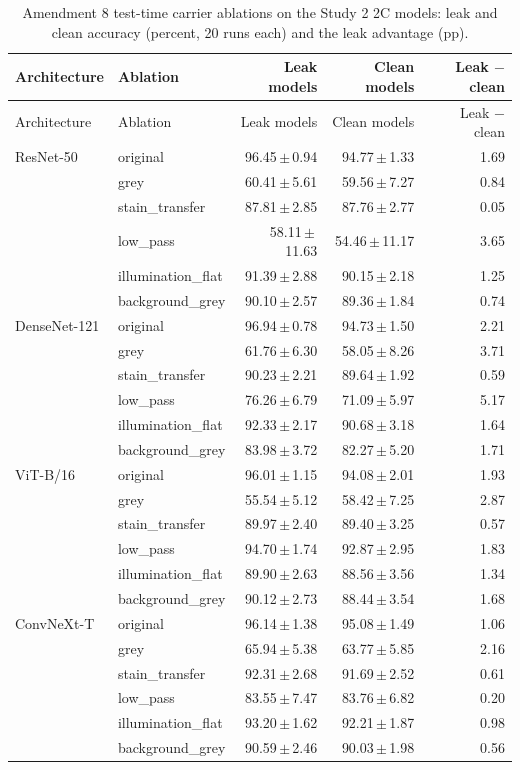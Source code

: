 {\footnotesize
\setlength{\tabcolsep}{3.5pt}
\begin{longtable}{llrrr}
\caption{Amendment 8 test-time carrier ablations on the Study 2 2C models: leak and clean accuracy (percent, 20 runs each) and the leak advantage (pp).}\label{r:tab:ablation}\\
\toprule
Architecture & Ablation & Leak models & Clean models & Leak $-$ clean \\
\midrule
\endfirsthead
\toprule
Architecture & Ablation & Leak models & Clean models & Leak $-$ clean \\
\midrule
\endhead
\bottomrule
\endfoot
ResNet-50 & original & 96.45\,$\pm$\,0.94 & 94.77\,$\pm$\,1.33 & 1.69 \\
 & grey & 60.41\,$\pm$\,5.61 & 59.56\,$\pm$\,7.27 & 0.84 \\
 & stain\_transfer & 87.81\,$\pm$\,2.85 & 87.76\,$\pm$\,2.77 & 0.05 \\
 & low\_pass & 58.11\,$\pm$\,11.63 & 54.46\,$\pm$\,11.17 & 3.65 \\
 & illumination\_flat & 91.39\,$\pm$\,2.88 & 90.15\,$\pm$\,2.18 & 1.25 \\
 & background\_grey & 90.10\,$\pm$\,2.57 & 89.36\,$\pm$\,1.84 & 0.74 \\
DenseNet-121 & original & 96.94\,$\pm$\,0.78 & 94.73\,$\pm$\,1.50 & 2.21 \\
 & grey & 61.76\,$\pm$\,6.30 & 58.05\,$\pm$\,8.26 & 3.71 \\
 & stain\_transfer & 90.23\,$\pm$\,2.21 & 89.64\,$\pm$\,1.92 & 0.59 \\
 & low\_pass & 76.26\,$\pm$\,6.79 & 71.09\,$\pm$\,5.97 & 5.17 \\
 & illumination\_flat & 92.33\,$\pm$\,2.17 & 90.68\,$\pm$\,3.18 & 1.64 \\
 & background\_grey & 83.98\,$\pm$\,3.72 & 82.27\,$\pm$\,5.20 & 1.71 \\
ViT-B/16 & original & 96.01\,$\pm$\,1.15 & 94.08\,$\pm$\,2.01 & 1.93 \\
 & grey & 55.54\,$\pm$\,5.12 & 58.42\,$\pm$\,7.25 & \textminus{}2.87 \\
 & stain\_transfer & 89.97\,$\pm$\,2.40 & 89.40\,$\pm$\,3.25 & 0.57 \\
 & low\_pass & 94.70\,$\pm$\,1.74 & 92.87\,$\pm$\,2.95 & 1.83 \\
 & illumination\_flat & 89.90\,$\pm$\,2.63 & 88.56\,$\pm$\,3.56 & 1.34 \\
 & background\_grey & 90.12\,$\pm$\,2.73 & 88.44\,$\pm$\,3.54 & 1.68 \\
ConvNeXt-T & original & 96.14\,$\pm$\,1.38 & 95.08\,$\pm$\,1.49 & 1.06 \\
 & grey & 65.94\,$\pm$\,5.38 & 63.77\,$\pm$\,5.85 & 2.16 \\
 & stain\_transfer & 92.31\,$\pm$\,2.68 & 91.69\,$\pm$\,2.52 & 0.61 \\
 & low\_pass & 83.55\,$\pm$\,7.47 & 83.76\,$\pm$\,6.82 & \textminus{}0.20 \\
 & illumination\_flat & 93.20\,$\pm$\,1.62 & 92.21\,$\pm$\,1.87 & 0.98 \\
 & background\_grey & 90.59\,$\pm$\,2.46 & 90.03\,$\pm$\,1.98 & 0.56 \\
\end{longtable}
}
